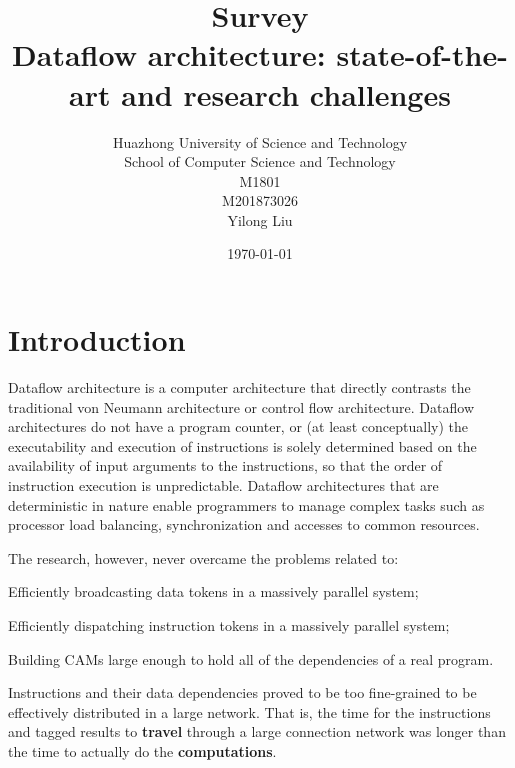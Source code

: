 \documentclass[UTF8,12pt,a4paper]{article}
\title{Survey \\ \bigskip \textbf{Dataflow architecture: state-of-the-art and research challenges}}
\author{Huazhong University of Science and Technology\\ School of Computer Science and Technology\\ M1801\\ M201873026\\ Yilong Liu}
\date{\today}
\begin{document}
\maketitle
\newpage


\tableofcontents
\newpage


\section{Introduction}
Dataflow architecture is a computer architecture that
directly contrasts the traditional von Neumann architecture
or control flow architecture.
Dataflow architectures do not have a program counter,
or (at least conceptually) the executability
and execution of instructions is solely determined
based on the availability of input arguments to the instructions,
so that the order of instruction execution is unpredictable.
Dataflow architectures that are deterministic in nature
enable programmers to manage complex tasks
such as processor load balancing, synchronization and accesses to common resources.

The research, however, never overcame the problems related to:
\begin{compactitem}
  \item Efficiently broadcasting data tokens in a massively parallel system;
  \item Efficiently dispatching instruction tokens in a massively parallel system;
  \item Building CAMs large enough to hold all of the dependencies of a real program.
\end{compactitem}
Instructions and their data dependencies proved to be too fine-grained to be effectively distributed in a large network.
That is, the time for the instructions and tagged results to \textbf{travel} through a large connection network
was longer than the time to actually do the \textbf{computations}.
\end{document}
